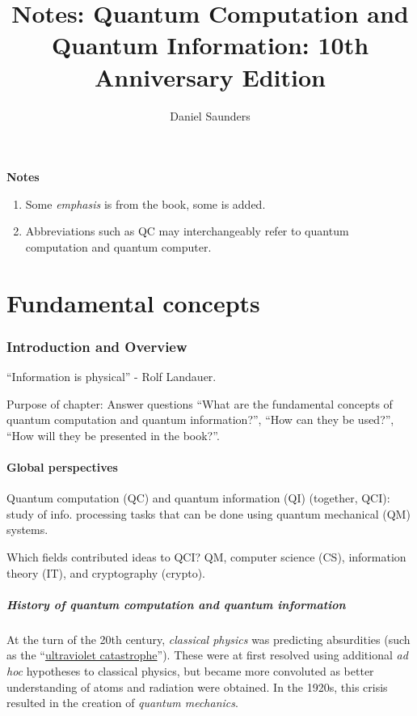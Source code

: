 \documentclass{article}
\title{Notes: Quantum Computation and Quantum Information: 10th Anniversary Edition}
\author{Daniel Saunders}
\begin{document}
\maketitle

\textbf{Notes}

\begin{enumerate}
	\item Some \textit{emphasis} is from the book, some is added.
	\item Abbreviations such as QC may interchangeably refer to quantum computation and quantum computer.
\end{enumerate}

\part{Fundamental concepts}

\section{Introduction and Overview}

``Information is physical'' - Rolf Landauer.

Purpose of chapter: Answer questions ``What are the fundamental concepts of quantum computation and quantum information?'', ``How can they be used?'', ``How will they be presented in the book?''.

\subsection{Global perspectives}

Quantum computation (QC) and quantum information (QI) (together, QCI): study of info. processing tasks that can be done using quantum mechanical (QM) systems.

Which fields contributed ideas to QCI? QM, computer science (CS), information theory (IT), and cryptography (crypto).

\subsubsection{History of quantum computation and quantum information}

At the turn of the 20th century, \textit{classical physics} was predicting absurdities (such as the ``\href{https://en.wikipedia.org/wiki/Ultraviolet_catastrophe}{ultraviolet catastrophe}''). These were at first resolved using additional \textit{ad hoc} hypotheses to classical physics, but became more convoluted as better understanding of atoms and radiation were obtained. In the 1920s, this crisis resulted in the creation of \textit{quantum mechanics}.
\end{document}
